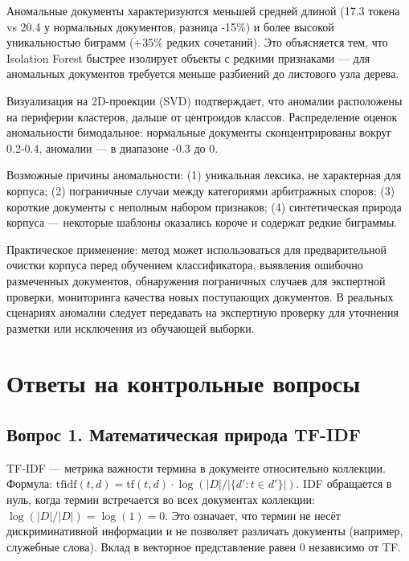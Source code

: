 \documentclass[12pt, a4paper]{report}
\begin{document}
Аномальные документы характеризуются меньшей средней длиной (17.3 токена vs 20.4
у нормальных документов, разница -15\%) и более высокой уникальностью биграмм
(+35\% редких сочетаний). Это объясняется тем, что Isolation Forest быстрее
изолирует объекты с редкими признаками — для аномальных документов требуется
меньше разбиений до листового узла дерева.

Визуализация на 2D-проекции (SVD) подтверждает, что аномалии расположены на
периферии кластеров, дальше от центроидов классов. Распределение оценок
аномальности бимодальное: нормальные документы сконцентрированы вокруг 0.2-0.4,
аномалии — в диапазоне -0.3 до 0.

Возможные причины аномальности: (1) уникальная лексика, не характерная для
корпуса; (2) пограничные случаи между категориями арбитражных споров; (3) короткие
документы с неполным набором признаков; (4) синтетическая природа корпуса —
некоторые шаблоны оказались короче и содержат редкие биграммы.

Практическое применение: метод может использоваться для предварительной очистки
корпуса перед обучением классификатора, выявления ошибочно размеченных документов,
обнаружения пограничных случаев для экспертной проверки, мониторинга качества
новых поступающих документов. В реальных сценариях аномалии следует передавать
на экспертную проверку для уточнения разметки или исключения из обучающей выборки.

\chapter{Ответы на контрольные вопросы}

\section{Вопрос 1. Математическая природа TF-IDF}

TF-IDF — метрика важности термина в документе относительно коллекции. Формула:
$\text{tfidf}(t,d) = \text{tf}(t,d) \cdot \log(|D| / |\{d': t \in d'\}|)$.
IDF обращается в нуль, когда термин встречается во всех документах коллекции:
$\log(|D|/|D|) = \log(1) = 0$. Это означает, что термин не несёт дискриминативной
информации и не позволяет различать документы (например, служебные слова).
Вклад в векторное представление равен 0 независимо от TF.
\end{document}

